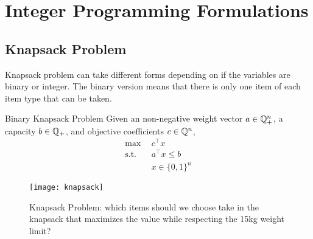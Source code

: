 \documentclass[../open-optimization/open-optimization.tex]{subfiles}
\begin{document}
\chapter{Integer Programming Formulations}
\label{sec:IP-formulations}
\section{Knapsack Problem}
Knapsack problem can take different forms depending on if the variables are binary or integer.  The binary version means that there is only one item of each item type that can be taken.
\begin{general}{Binary Knapsack Problem}{\npcomplete}
Given an non-negative weight vector $a \in {\mathbb{Q}}^n_+$, a capacity $b \in {\mathbb{Q}}_+$, and objective coefficients $c \in {\mathbb{Q}}^n$, 
\begin{equation}
\begin{split}
\max \ \ & c^\top x\\
\text{s.t.}\ \ & a^\top x \leq b\\
& x \in \{0,1\}^n
\end{split}
\end{equation}
\end{general}
\begin{figure}[H]
\begin{center}
\texttt{[image: knapsack]}\footnotemark \end{center}
\label{fig:knapsack}
\caption{Knapsack Problem: which items should we choose take in the knapsack that maximizes the value while respecting the 15kg weight limit?}
\end{figure}
\end{document}
